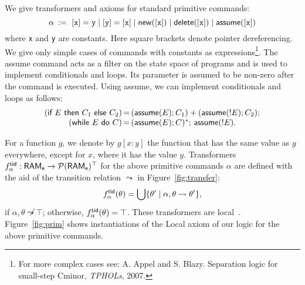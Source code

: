 We give transformers and axioms for standard primitive commands:
$$
\alpha  \::=\  [{\tt x}] = {\tt y} \mid [{\tt y}] = [{\tt x}] \mid {\sf new}([{\tt x}]) \mid 
 {\sf delete}([{\tt x}]) \mid {\sf assume}([{\tt x}])
$$
where {\tt x} and {\tt y} are constants. Here square brackets denote pointer
dereferencing. We give only simple cases of commands with constants as
expressions\footnote{For more complex cases see: A. Appel and
  S. Blazy. Separation logic for small-step Cminor, {\em TPHOLs}, 2007.}.  The
{\sf assume} command acts as a filter on the state space of programs and is used
to implement conditionals and loops. Its parameter is assumed to be non-zero
after the command is executed.  Using {\sf assume}, we can implement
conditionals and loops as follows:
$$
\begin{array}{@{}r@{\, }c@{\, }l@{}}
(\textsf{if}\ E\ \textsf{then}\ C_1\ \textsf{else}\ C_2)
& = &
({\sf assume}(E);C_{1}) + ({\sf assume}(!E);C_{2});
\\
(\textsf{while}\ E\ \textsf{do}\ C)
& = &
({\sf assume}(E);C)^*;\, {\sf assume}(!E).
\end{array}
$$

For a function $g$, we denote by $g[x:y]$ the function that has the same value
as $g$ everywhere, except for $x$, where it has the value $y$.
Transformers $f^{{\sf tid}}_ \alpha: {\sf RAM}_{{\sf e}} \to \mathcal{P}({\sf RAM}_{{\sf e}})^\top$ for the above
primitive commands $ \alpha$ are defined with the aid of the transition relation
$\leadsto$ in Figure~\ref{fig:transfer}: 
$$
f^{{\sf tid}}_ \alpha (\theta)= \bigcup \{\theta' \mid  \alpha,\theta \leadsto \theta'\},
$$
if $ \alpha, \theta \not\leadsto \top$; otherwise, $f^{{\sf tid}}_ \alpha (\theta)=\top$.  These
transformers are local~\cite{asl}. Figure~\ref{fig:prim} shows instantiations
of the {\sc Local} axiom of our logic for the above primitive commands.


